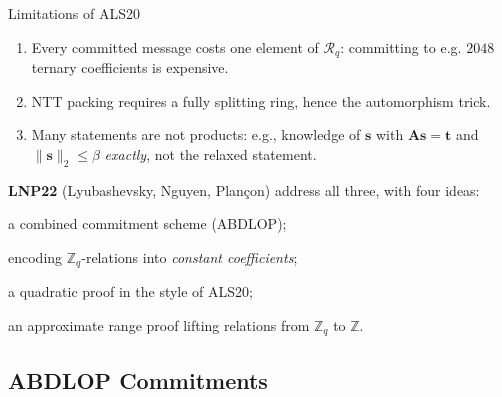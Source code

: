 \documentclass{zkdl-presentation-template}
\begin{document}
    \begin{frame}{Limitations of ALS20}
        \begin{enumerate}
            \item[\textit{(i)}] Every committed message costs one element of $\mathcal{R}_q$: committing to e.g. $2048$ ternary coefficients is expensive.\pause
            \item[\textit{(ii)}] NTT packing requires a fully splitting ring, hence the automorphism trick.\pause
            \item[\textit{(iii)}] Many statements are not products: e.g., knowledge of $\mathbf{s}$ with $\mathbf{A}\mathbf{s} = \mathbf{t}$ and $\|\mathbf{s}\|_2 \leq \beta$ \emph{exactly}, not the relaxed statement.
        \end{enumerate}
        \pause

        \textbf{LNP22} (Lyubashevsky, Nguyen, Plan\c{c}on) address all three, with four ideas:
        \begin{algoen}
            \item a combined commitment scheme (ABDLOP);\pause
            \item encoding $\mathbb{Z}_q$-relations into \emph{constant coefficients};\pause
            \item a quadratic proof in the style of ALS20;\pause
            \item an approximate range proof lifting relations from $\mathbb{Z}_q$ to $\mathbb{Z}$.
        \end{algoen}
    \end{frame}

    \subsection{ABDLOP Commitments}
\end{document}
